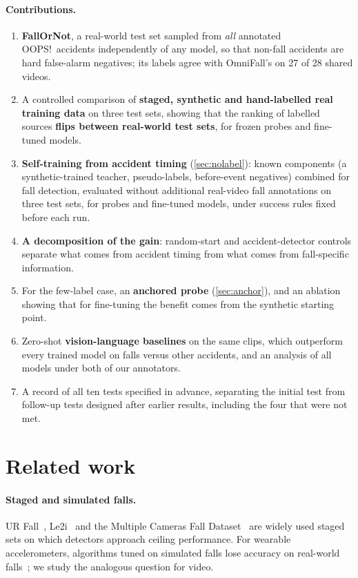 \documentclass[10pt,twocolumn,letterpaper]{article}
\begin{document}
\paragraph{Contributions.}
\begin{enumerate}\setlength\itemsep{1pt}
\item \textbf{FallOrNot}, a real-world test set sampled from \emph{all} annotated OOPS!\ accidents independently of any model, so that non-fall accidents are hard false-alarm negatives; its labels agree with OmniFall's on 27 of 28 shared videos.
\item A controlled comparison of \textbf{staged, synthetic and hand-labelled real training data} on three test sets, showing that the ranking of labelled sources \textbf{flips between real-world test sets}, for frozen probes and fine-tuned models.
\item \textbf{Self-training from accident timing} (\cref{sec:nolabel}): known components (a synthetic-trained teacher, pseudo-labels, before-event negatives) combined for fall detection, evaluated without additional real-video fall annotations on three test sets, for probes and fine-tuned models, under success rules fixed before each run.
\item \textbf{A decomposition of the gain}: random-start and accident-detector controls separate what comes from accident timing from what comes from fall-specific information.
\item For the few-label case, an \textbf{anchored probe} (\cref{sec:anchor}), and an ablation showing that for fine-tuning the benefit comes from the synthetic starting point.
\item Zero-shot \textbf{vision-language baselines} on the same clips, which outperform every trained model on falls versus other accidents, and an analysis of all models under both of our annotators.
\item A record of all ten tests specified in advance, separating the initial test from follow-up tests designed after earlier results, including the four that were not met.
\end{enumerate}

\section{Related work}
\paragraph{Staged and simulated falls.} UR Fall~\cite{kwolek2014}, Le2i~\cite{charfi2013} and the Multiple Cameras Fall Dataset~\cite{auvinet_mcfd} are widely used staged sets on which detectors approach ceiling performance. For wearable accelerometers, algorithms tuned on simulated falls lose accuracy on real-world falls~\cite{bagala2012,klenk2016}; we study the analogous question for video.
\end{document}
